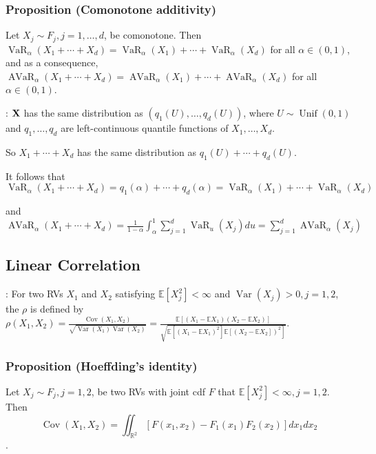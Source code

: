 \subsubsection*{Proposition (Comonotone additivity)}
Let $X_{j} \sim F_{j}, j=1, \ldots, d$, be comonotone. Then
$
\operatorname{VaR}_{\alpha}\left(X_{1}+\cdots+X_{d}\right)=\operatorname{VaR}_{\alpha}\left(X_{1}\right)+\cdots+\operatorname{VaR}_{\alpha}\left(X_{d}\right)$ for all $ \alpha \in(0,1)
$, and as a consequence,
$
\operatorname{AVaR}_{\alpha}\left(X_{1}+\cdots+X_{d}\right)=\operatorname{AVaR}_{\alpha}\left(X_{1}\right)+\cdots+\operatorname{AVaR}_{\alpha}\left(X_{d}\right)$ for all $ \alpha \in(0,1)$.

: $\operatorname{\boldsymbol{\mathbf{X}}}$ has the same distribution as $\left(q_{1}(U), \ldots, q_{d}(U)\right)$, where $U \sim \operatorname{Unif}(0,1)$ and $q_{1}, \ldots, q_{d}$ are left-continuous quantile functions of $X_{1}, \ldots, X_{d}$.


So $X_{1}+\cdots+X_{d}$ has the same distribution as $q_{1}(U)+\cdots+q_{d}(U)$.


It follows that
$
\operatorname{VaR}_{\alpha}\left(X_{1}+\cdots+X_{d}\right)=q_{1}(\alpha)+\cdots+q_{d}(\alpha)=\operatorname{VaR}_{\alpha}\left(X_{1}\right)+\cdots+\operatorname{VaR}_{\alpha}\left(X_{d}\right)
$

and
$
\operatorname{AVaR}_{\alpha}\left(X_{1}+\cdots+X_{d}\right)=\frac{1}{1-\alpha} \int_{\alpha}^{1} \sum_{j=1}^{d} \operatorname{VaR}_{u}\left(X_{j}\right) d u=\sum_{j=1}^{d} \operatorname{AVaR}_{\alpha}\left(X_{j}\right)
$





\subsection*{Linear Correlation}
: For two RVs $X_{1}$ and $X_{2}$ satisfying $\mathbb{E}\left[X_{j}^{2}\right]<\infty$ and $\operatorname{Var}\left(X_{j}\right)>0, j=1,2$, the  $\rho$ is defined by
$
\rho\left(X_{1}, X_{2}\right)=\frac{\operatorname{Cov}\left(X_{1}, X_{2}\right)}{\sqrt{\operatorname{Var}\left(X_{1}\right) \operatorname{Var}\left(X_{2}\right)}} =\frac{\mathbb{E}\left[\left(X_{1}-\mathbb{E} X_{1}\right)\left(X_{2}-\mathbb{E} X_{2}\right)\right]}{\sqrt{\left.\mathbb{E}\left[\left(X_{1}-\mathbb{E} X_{1}\right)^{2}\right] \mathbb{E}\left[\left(X_{2}-\mathbb{E} X_{2}\right]\right)^{2}\right]}}
$.


\subsubsection*{Proposition (Hoeffding’s identity)}
Let $X_{j} \sim F_{j}, j=1,2$, be two RVs with joint cdf $F$ that $\mathbb{E}\left[X_{j}^{2}\right]<\infty, j=1,2$. Then
$$
\operatorname{Cov}\left(X_{1}, X_{2}\right)=\iint_{\mathbb{R}^{2}}\left[F\left(x_{1}, x_{2}\right)-F_{1}\left(x_{1}\right) F_{2}\left(x_{2}\right)\right] d x_{1} d x_{2}
$$.

